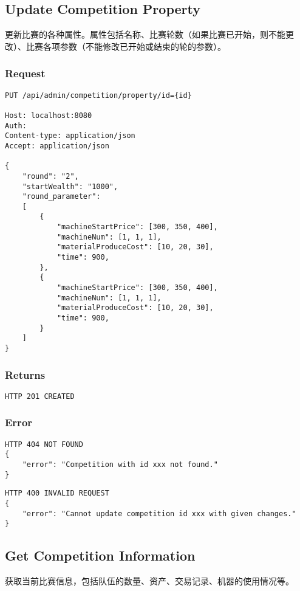 \documentclass{article}
\begin{document}
\subsection{Update Competition Property}

更新比赛的各种属性。属性包括名称、比赛轮数（如果比赛已开始，则不能更改）、比赛各项参数（不能修改已开始或结束的轮的参数）。

\subsubsection*{Request}
\begin{lstlisting}
PUT /api/admin/competition/property/id={id}

Host: localhost:8080
Auth:
Content-type: application/json
Accept: application/json

{
    "round": "2",
    "startWealth": "1000",
    "round_parameter":
    [
        {
            "machineStartPrice": [300, 350, 400],
            "machineNum": [1, 1, 1],
            "materialProduceCost": [10, 20, 30],
            "time": 900,
        },
        {
            "machineStartPrice": [300, 350, 400],
            "machineNum": [1, 1, 1],
            "materialProduceCost": [10, 20, 30],
            "time": 900,
        }
    ]
}
\end{lstlisting}

\subsubsection*{Returns}
\begin{lstlisting}
HTTP 201 CREATED
\end{lstlisting}

\subsubsection*{Error}
\begin{lstlisting}
HTTP 404 NOT FOUND
{
    "error": "Competition with id xxx not found."
}
\end{lstlisting}

\begin{lstlisting}
HTTP 400 INVALID REQUEST
{
    "error": "Cannot update competition id xxx with given changes."
}
\end{lstlisting}

\subsection{Get Competition Information}
获取当前比赛信息，包括队伍的数量、资产、交易记录、机器的使用情况等。
\end{document}
